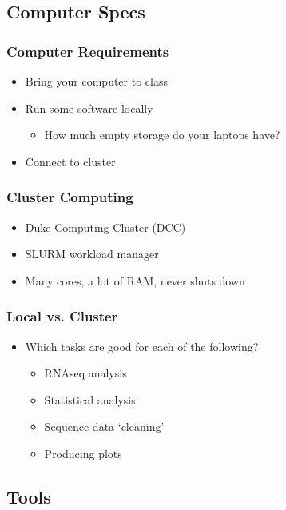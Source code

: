 \documentclass[14pt]{beamer}
\begin{document}
\subsection{Computer Specs}

\begin{frame}
\frametitle{Computer Requirements}
\begin{itemize}
	\item Bring your computer to class
	\item Run some software locally
	\begin{itemize}
		\item How much empty storage do your laptops have?
	\end{itemize}
	\item Connect to cluster
\end{itemize}
\end{frame}

\begin{frame}
\frametitle{Cluster Computing}
\begin{itemize}
	\item Duke Computing Cluster (DCC)
	\item SLURM workload manager
	\item Many cores, a lot of RAM, never shuts down
\end{itemize}
\end{frame}

\begin{frame}
\frametitle{Local vs. Cluster}
\begin{itemize}
	\item Which tasks are good for each of the following?
	\begin{itemize}
	\item<+-> RNAseq analysis %
	\item<+-> Statistical analysis %
	\item<+-> Sequence data `cleaning' %
	\item<+-> Producing plots %
	\end{itemize}
\end{itemize}
\end{frame}

\subsection{Tools}
\end{document}
